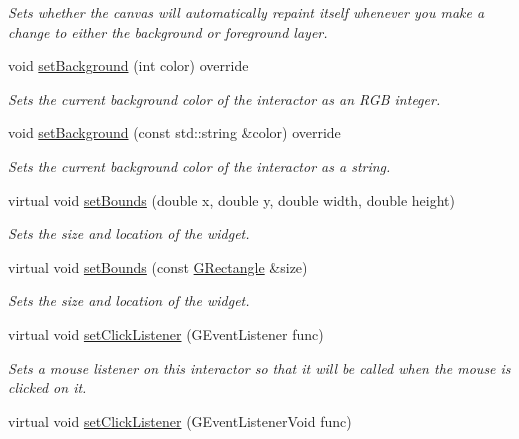 \begin{DoxyCompactItemize}
\begin{DoxyCompactList}\small\item\em Sets whether the canvas will automatically repaint itself whenever you make a change to either the background or foreground layer. \end{DoxyCompactList}\item 
void \mbox{\hyperlink{classGCanvas_a10d305826534b55561ea88730fc9f6cd}{set\+Background}} (int color) override
\begin{DoxyCompactList}\small\item\em Sets the current background color of the interactor as an R\+GB integer. \end{DoxyCompactList}\item 
void \mbox{\hyperlink{classGCanvas_a9cb99695b93494c7ba28268ce9e42c2a}{set\+Background}} (const std\+::string \&color) override
\begin{DoxyCompactList}\small\item\em Sets the current background color of the interactor as a string. \end{DoxyCompactList}\item 
virtual void \mbox{\hyperlink{classGInteractor_a2aae8197624b72265ab83b4f1bc73f2f}{set\+Bounds}} (double x, double y, double width, double height)
\begin{DoxyCompactList}\small\item\em Sets the size and location of the widget. \end{DoxyCompactList}\item 
virtual void \mbox{\hyperlink{classGInteractor_acada386653f008cacc7cce86426bef7c}{set\+Bounds}} (const \mbox{\hyperlink{structGRectangle}{G\+Rectangle}} \&size)
\begin{DoxyCompactList}\small\item\em Sets the size and location of the widget. \end{DoxyCompactList}\item 
virtual void \mbox{\hyperlink{classGInteractor_abd40af6921242584d0954f173911b190}{set\+Click\+Listener}} (G\+Event\+Listener func)
\begin{DoxyCompactList}\small\item\em Sets a mouse listener on this interactor so that it will be called when the mouse is clicked on it. \end{DoxyCompactList}\item 
virtual void \mbox{\hyperlink{classGInteractor_a856414c92df90f56f3877475eb3f8fc4}{set\+Click\+Listener}} (G\+Event\+Listener\+Void func)

\end{DoxyCompactItemize}
